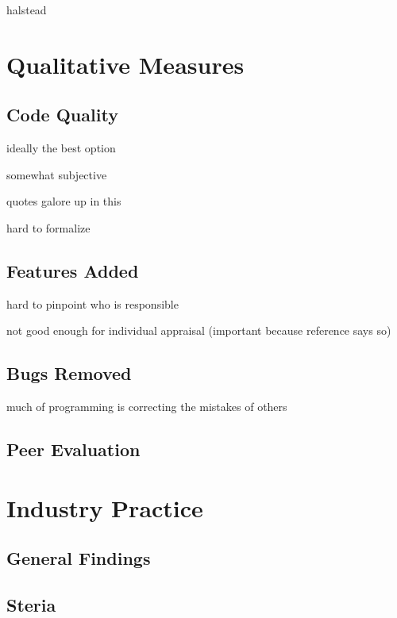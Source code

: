 \documentclass[letterpaper, 10pt]{report}
\begin{document}
halstead




\section{Qualitative Measures}

\subsection{Code Quality}
ideally the best option

somewhat subjective

quotes galore up in this

hard to formalize


\subsection{Features Added}
hard to pinpoint who is responsible

not good enough for individual appraisal (important because reference says so)


\subsection{Bugs Removed}
much of programming is correcting the mistakes of others


\subsection{Peer Evaluation}



\section{Industry Practice}

\subsection{General Findings}

\subsection{Steria}
\end{document}
